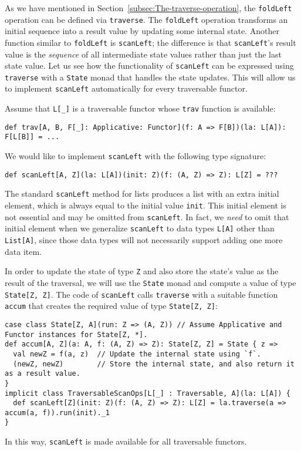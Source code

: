 As we have mentioned in Section~\ref{subsec:The-traverse-operation},
the \lstinline!foldLeft! operation can be defined via \lstinline!traverse!.
The \lstinline!foldLeft! operation transforms an initial sequence
into a result value by updating some internal state. Another function
similar to \lstinline!foldLeft! is \lstinline!scanLeft!; the difference
is that \lstinline!scanLeft!\textsf{'}s result value is the \emph{sequence}
of all intermediate state values rather than just the last state value.
Let us see how the functionality of \lstinline!scanLeft! can be expressed
using \lstinline!traverse! with a \lstinline!State! monad that handles
the state updates. This will allow us to implement \lstinline!scanLeft!
automatically for every traversable functor.

Assume that \lstinline!L[_]! is a traversable functor whose \lstinline!trav!
function is available:
\begin{lstlisting}
def trav[A, B, F[_]: Applicative: Functor](f: A => F[B])(la: L[A]): F[L[B]] = ...
\end{lstlisting}
We would like to implement \lstinline!scanLeft! with the following
type signature:
\begin{lstlisting}
def scanLeft[A, Z](la: L[A])(init: Z)(f: (A, Z) => Z): L[Z] = ???
\end{lstlisting}
The standard \lstinline!scanLeft! method for lists produces a list
with an extra initial element, which is always equal to the initial
value \lstinline!init!. This initial element is not essential and
may be omitted from \lstinline!scanLeft!. In fact, we \emph{need}
to omit that initial element when we generalize \lstinline!scanLeft!
to data types \lstinline!L[A]! other than \lstinline!List[A]!, since
those data types will not necessarily support adding one more data
item.

In order to update the state of type \lstinline!Z! and also store
the state\textsf{'}s value as the result of the traversal, we will use the
\lstinline!State! monad and compute a value of type \lstinline!State[Z, Z]!.
The code of \lstinline!scanLeft! calls \lstinline!traverse! with
a suitable function \lstinline!accum! that creates the required value
of type \lstinline!State[Z, Z]!:
\begin{lstlisting}
case class State[Z, A](run: Z => (A, Z)) // Assume Applicative and Functor instances for State[Z, *].
def accum[A, Z](a: A, f: (A, Z) => Z): State[Z, Z] = State { z =>
  val newZ = f(a, z)  // Update the internal state using `f`.
  (newZ, newZ)        // Store the internal state, and also return it as a result value.
}
implicit class TraversableScanOps[L[_] : Traversable, A](la: L[A]) {
  def scanLeft[Z](init: Z)(f: (A, Z) => Z): L[Z] = la.traverse(a => accum(a, f)).run(init)._1
}
\end{lstlisting}
In this way, \lstinline!scanLeft! is made available for all traversable
functors.

